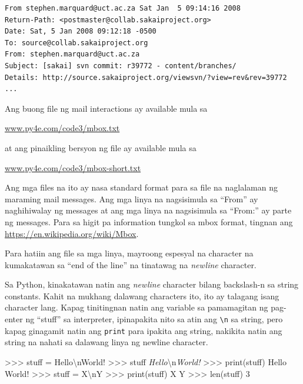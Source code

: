 \documentclass[10pt,]{book}
\newenvironment{Shaded}{}{}
\newcommand{\BuiltInTok}[1]{\textcolor[rgb]{0.00,0.50,0.00}{#1}}
\newcommand{\CharTok}[1]{\textcolor[rgb]{0.25,0.44,0.63}{#1}}
\newcommand{\CommentTok}[1]{\textcolor[rgb]{0.38,0.63,0.69}{\textit{#1}}}
\newcommand{\DecValTok}[1]{\textcolor[rgb]{0.25,0.63,0.44}{#1}}
\newcommand{\NormalTok}[1]{#1}
\newcommand{\OperatorTok}[1]{\textcolor[rgb]{0.40,0.40,0.40}{#1}}
\newcommand{\StringTok}[1]{\textcolor[rgb]{0.25,0.44,0.63}{#1}}
\begin{document}
{\small
\begin{verbatim}
From stephen.marquard@uct.ac.za Sat Jan  5 09:14:16 2008
Return-Path: <postmaster@collab.sakaiproject.org>
Date: Sat, 5 Jan 2008 09:12:18 -0500
To: source@collab.sakaiproject.org
From: stephen.marquard@uct.ac.za
Subject: [sakai] svn commit: r39772 - content/branches/
Details: http://source.sakaiproject.org/viewsvn/?view=rev&rev=39772
...
\end{verbatim}
}

Ang buong file ng mail interactions ay available mula sa

\href{http://www.py4e.com/code3/mbox.txt}{www.py4e.com/code3/mbox.txt}

at ang pinaikling bersyon ng file ay available mula sa

\href{http://www.py4e.com/code3/mbox-short.txt}{www.py4e.com/code3/mbox-short.txt}

Ang mga files na ito ay nasa standard format para sa file na naglalaman
ng maraming mail messages. Ang mga linya na nagsisimula sa ``From'' ay
naghihiwalay ng messages at ang mga linya na nagsisimula sa ``From:'' ay
parte ng messages. Para sa higit pa information tungkol sa mbox format,
tingnan ang \url{https://en.wikipedia.org/wiki/Mbox}.

Para hatiin ang file sa mga linya, mayroong espesyal na character na
kumakatawan sa ``end of the line'' na tinatawag na \emph{newline}
character.


Sa Python, kinakatawan natin ang \emph{newline} character bilang
backslash-n sa string constants. Kahit na mukhang dalawang characters
ito, ito ay talagang isang character lang. Kapag tinitingnan natin ang
variable sa pamamagitan ng pag-enter ng ``stuff'' sa interpreter,
ipinapakita nito sa atin ang \texttt{\textbackslash{}n} sa string, pero
kapag ginagamit natin ang \texttt{print} para ipakita ang string,
nakikita natin ang string na nahati sa dalawang linya ng newline
character.

\begin{Shaded}
\begin{Highlighting}[]
\OperatorTok{\textgreater{}\textgreater{}\textgreater{}}\NormalTok{ stuff }\OperatorTok{=} \StringTok{\textquotesingle{}Hello}\CharTok{\textbackslash{}n}\StringTok{World!\textquotesingle{}}
\OperatorTok{\textgreater{}\textgreater{}\textgreater{}}\NormalTok{ stuff}
\CommentTok{\textquotesingle{}Hello}\CharTok{\textbackslash{}n}\CommentTok{World!\textquotesingle{}}
\OperatorTok{\textgreater{}\textgreater{}\textgreater{}} \BuiltInTok{print}\NormalTok{(stuff)}
\NormalTok{Hello}
\NormalTok{World}\OperatorTok{!}
\OperatorTok{\textgreater{}\textgreater{}\textgreater{}}\NormalTok{ stuff }\OperatorTok{=} \StringTok{\textquotesingle{}X}\CharTok{\textbackslash{}n}\StringTok{Y\textquotesingle{}}
\OperatorTok{\textgreater{}\textgreater{}\textgreater{}} \BuiltInTok{print}\NormalTok{(stuff)}
\NormalTok{X}
\NormalTok{Y}
\OperatorTok{\textgreater{}\textgreater{}\textgreater{}} \BuiltInTok{len}\NormalTok{(stuff)}
\DecValTok{3}
\end{Highlighting}
\end{Shaded}
\end{document}
